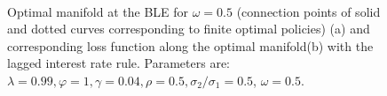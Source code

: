  \begin{figure}
    \begin{center}
        \mbox{\quad
        }
        \end{center}
   \caption{ \label{lossfopt_trlag}
  Optimal manifold at the BLE for $\omega=0.5$ (connection points of solid and dotted curves corresponding to finite optimal policies) (a) and corresponding loss function along the optimal manifold(b) with the lagged interest rate rule.
   Parameters are: $\lambda=0.99, \varphi=1, \gamma=0.04, \rho=0.5, \sigma_{2}/\sigma_1=0.5$, $\omega=0.5$. }
    \end{figure}   